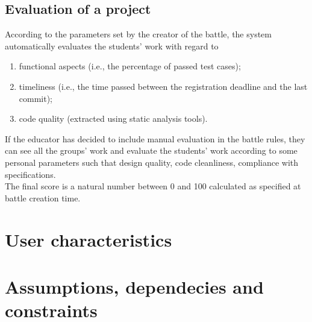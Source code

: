 \subsection{Evaluation of a project}
According to the parameters set by the creator of the battle, the system automatically evaluates the students' work with regard to
\begin{enumerate}
  \item functional aspects (i.e., the percentage of passed test cases);
  \item timeliness (i.e., the time passed between the registration deadline and the last commit);
  \item code quality (extracted using static analysis tools).
\end{enumerate}
If the educator has decided to include manual evaluation in the battle rules, they can see all the groups' work and evaluate 
the students' work according to some personal parameters such that design quality, code cleanliness, compliance with specifications.\\
The final score is a natural number between 0 and 100 calculated as specified at battle creation time.\\


\section{User characteristics}

\section{Assumptions, dependecies and constraints}

